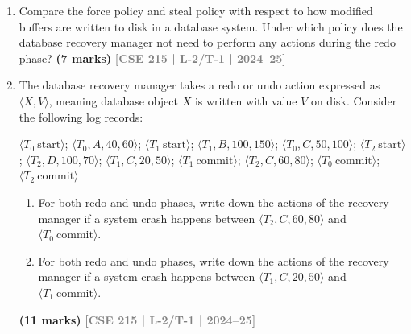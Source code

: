 \documentclass[12pt,a3paper]{article}
\newcommand{\yr}[1]{\hfill\textcolor{gray}{\small\textbf{[#1]}}}
\newcommand{\mk}[1]{\textcolor{orange!70!black}{\small\textbf{(#1 marks)}}}
\begin{document}
\begin{enumerate}

\item Compare the force policy and steal policy with respect to how modified buffers are written to disk in a database system. Under which policy does the database recovery manager not need to perform any actions during the redo phase?
\mk{7} \yr{CSE 215 | L-2/T-1 | 2024--25}

\item The database recovery manager takes a redo or undo action expressed as $\langle X, V\rangle$, meaning database object $X$ is written with value $V$ on disk. Consider the following log records:
\begin{center}
\small\ttfamily
$\langle T_0\ \text{start}\rangle$; $\langle T_0, A, 40, 60\rangle$; $\langle T_1\ \text{start}\rangle$; $\langle T_1, B, 100, 150\rangle$; $\langle T_0, C, 50, 100\rangle$; $\langle T_2\ \text{start}\rangle$; $\langle T_2, D, 100, 70\rangle$; $\langle T_1, C, 20, 50\rangle$; $\langle T_1\ \text{commit}\rangle$; $\langle T_2, C, 60, 80\rangle$; $\langle T_0\ \text{commit}\rangle$; $\langle T_2\ \text{commit}\rangle$
\end{center}
\begin{enumerate}
  \item For both redo and undo phases, write down the actions of the recovery manager if a system crash happens between $\langle T_2, C, 60, 80\rangle$ and $\langle T_0\ \text{commit}\rangle$.
  \item For both redo and undo phases, write down the actions of the recovery manager if a system crash happens between $\langle T_1, C, 20, 50\rangle$ and $\langle T_1\ \text{commit}\rangle$.
\end{enumerate}
\mk{11} \yr{CSE 215 | L-2/T-1 | 2024--25}


\end{enumerate}
\end{document}
